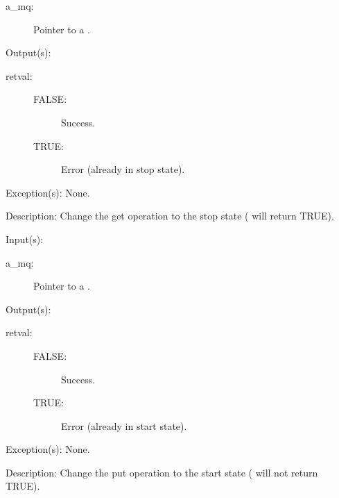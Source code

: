 \begin{capi}
\begin{capilist}
\begin{description}
		\item[a\_mq: ]
			Pointer to a .
		\end{description}
	\item[Output(s): ]
		\begin{description}\item[]
		\item[retval: ]
			\begin{description}\item[]
			\item[FALSE: ] Success.
			\item[TRUE: ] Error (already in stop state).
			\end{description}
		\end{description}
	\item[Exception(s): ] None.
	\item[Description: ]
		Change the get operation to the stop state
		( will return TRUE).
	\end{capilist}
\label{mq_put_start}
	\begin{capilist}
	\item[Input(s): ]
		\begin{description}\item[]
		\item[a\_mq: ]
			Pointer to a .
		\end{description}
	\item[Output(s): ]
		\begin{description}\item[]
		\item[retval: ]
			\begin{description}\item[]
			\item[FALSE: ] Success.
			\item[TRUE: ] Error (already in start state).
			\end{description}
		\end{description}
	\item[Exception(s): ] None.
	\item[Description: ]
		Change the put operation to the start state
		( will not return TRUE).
	\end{capilist}
\label{mq_put_stop}
	\begin{capilist}

\end{capilist}
\end{capi}
